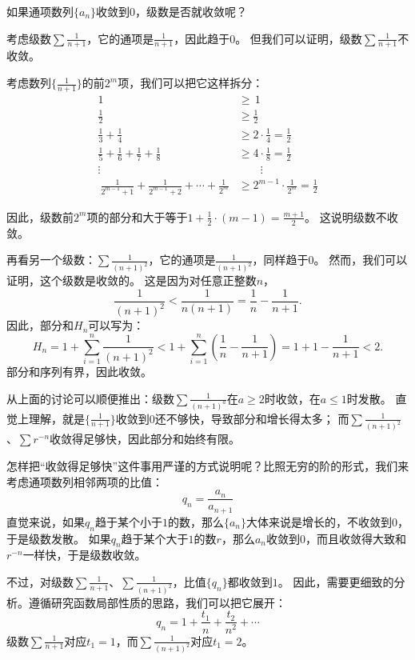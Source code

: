 \documentclass[12pt,UTF8]{ctexbook}
\theoremstyle{definition}
\theoremstyle{plain}
\begin{document}
如果通项数列$\{a_n\}$收敛到$0$，级数是否就收敛呢？

考虑级数$\sum \frac{1}{n+1}$，它的通项是$\frac{1}{n+1}$，因此趋于$0$。
但我们可以证明，级数$\sum \frac{1}{n+1}$不收敛。

考虑数列$\{\frac{1}{n+1}\}$的前$2^m$项，我们可以把它这样拆分：
\begin{align*}
    1 \, &\geqslant \, 1  \\
    \frac{1}{2} &\geqslant \frac{1}{2}  \\
    \frac{1}{3} + \frac{1}{4} &\geqslant 2 \cdot \frac{1}{4} = \frac{1}{2}  \\
    \frac{1}{5} + \frac{1}{6} + \frac{1}{7} + \frac{1}{8} &\geqslant 4 \cdot \frac{1}{8} = \frac{1}{2}  \\
    \vdots \qquad & \qquad \vdots  \\\
    \frac{1}{2^{m-1}+1} + \frac{1}{2^{m-1}+2} + \cdots + \frac{1}{2^{m}} &\geqslant 2^{m-1} \cdot \frac{1}{2^{m}} = \frac{1}{2}  
\end{align*}

因此，级数前$2^m$项的部分和大于等于$1 + \frac12 \cdot (m - 1) = \frac{m+1}{2}$。
这说明级数不收敛。

再看另一个级数：$\sum \frac{1}{(n+1)^2}$，它的通项是$\frac{1}{(n+1)^2}$，同样趋于$0$。
然而，我们可以证明，这个级数是收敛的。
这是因为对任意正整数$n$，
$$ \frac{1}{(n+1)^2} < \frac{1}{n(n+1)} = \frac{1}{n} - \frac{1}{n+1}.$$
因此，部分和$H_n$可以写为：
$$ H_n = 1 + \sum_{i=1}^n \frac{1}{(n+1)^2} < 1 + \sum_{i=1}^n \left(\frac{1}{n} - \frac{1}{n+1}\right) = 1 + 1 - \frac{1}{n+1} < 2. $$
部分和序列有界，因此收敛。

从上面的讨论可以顺便推出：级数$\sum \frac{1}{(n+1)^a}$在$a\geqslant 2$时收敛，在$a\leqslant 1$时发散。
直觉上理解，就是$\{\frac{1}{n+1}\}$收敛到$0$还不够快，导致部分和增长得太多；
而$\sum \frac{1}{(n+1)^2}$、$\sum r^{-n}$收敛得足够快，因此部分和始终有限。

怎样把“收敛得足够快”这件事用严谨的方式说明呢？比照无穷的阶的形式，我们来考虑通项数列相邻两项的比值：
$$ q_n = \frac{a_n}{a_{n+1}} $$
直觉来说，如果$q_n$趋于某个小于$1$的数，那么$\{a_n\}$大体来说是增长的，不收敛到$0$，于是级数发散。
如果$q_n$趋于某个大于$1$的数$r$，那么$a_n$收敛到$0$，而且收敛得大致和$r^{-n}$一样快，于是级数收敛。

不过，对级数$\sum \frac{1}{n+1}$、$\sum \frac{1}{(n+1)^2}$，比值$\{q_n\}$都收敛到$1$。
因此，需要更细致的分析。遵循研究函数局部性质的思路，我们可以把它展开：
$$ q_n = 1 + \frac{t_1}{n} + \frac{t_2}{n^2} + \cdots $$
级数$\sum \frac{1}{n+1}$对应$t_1 = 1$，而$\sum \frac{1}{(n+1)^2}$对应$t_1 = 2$。
\end{document}

